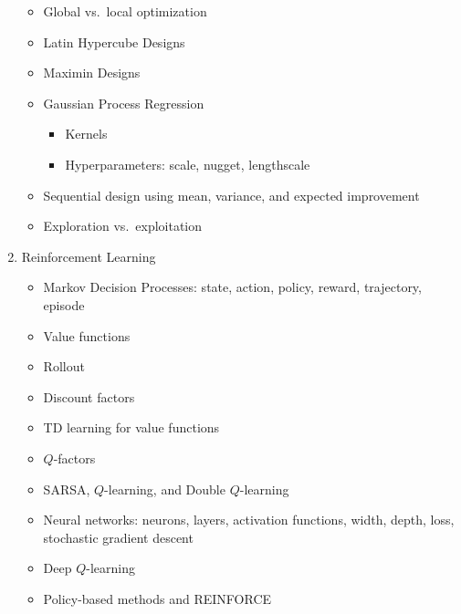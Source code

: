 \documentclass[pal,wide]{pajarticle}
\begin{document}
\begin{enumerate}
	\begin{itemize}
		\item Global vs.\ local optimization
		\item Latin Hypercube Designs
		\item Maximin Designs
		\item Gaussian Process Regression
		\begin{itemize}
			\item Kernels
			\item Hyperparameters: scale, nugget, lengthscale
		\end{itemize}
		\item Sequential design using mean, variance, and expected improvement
		\item Exploration vs.\ exploitation
	\end{itemize}
	\item Reinforcement Learning
	\begin{itemize}
		\item Markov Decision Processes: state, action, policy, reward, trajectory, episode
		\item Value functions
		\item Rollout
		\item Discount factors
		\item TD learning for value functions
		\item $Q$-factors
		\item SARSA, $Q$-learning, and Double $Q$-learning
		\item Neural networks: neurons, layers, activation functions, width, depth, loss, stochastic gradient descent
		\item Deep $Q$-learning
		\item Policy-based methods and REINFORCE
	\end{itemize}
\end{enumerate}
\end{document}
